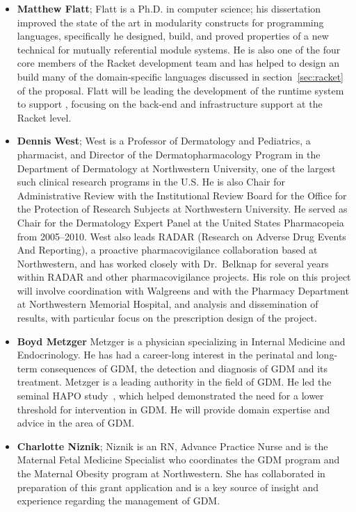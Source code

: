\begin{itemize}
\item\textbf{Matthew Flatt}; Flatt is a Ph.D. in computer science; his
  dissertation improved the state of the art in modularity constructs
  for programming languages, specifically he designed, build, and
  proved properties of a new technical for mutually referential
  module systems. He is also one of the four core members of the
  Racket development team and has helped to design an build many of
  the domain-specific languages discussed in section~\ref{sec:racket}
  of the proposal. Flatt will be leading the development of the
  runtime system to support \poppl{}, focusing on the back-end and
  infrastructure support at the Racket level.

\item\textbf{Dennis West}; West is a Professor of Dermatology and
  Pediatrics, a pharmacist, and Director of the Dermatopharmacology
  Program in the Department of Dermatology at Northwestern University,
  one of the largest such clinical research programs in the U.S. He is
  also Chair for Administrative Review with the Institutional Review
  Board for the Office for the Protection of Research Subjects at
  Northwestern University.  He served as Chair for the Dermatology
  Expert Panel at the United States Pharmacopeia from 2005--2010. West
  also leads RADAR (Research on Adverse Drug Events And Reporting), a
  proactive pharmacovigilance collaboration based at Northwestern, and
  has worked closely with Dr.\ Belknap for several years within RADAR
  and other pharmacovigilance projects. His role on this project will
  involve coordination with Walgreens and with the Pharmacy Department
  at Northwestern Memorial Hospital, and analysis and dissemination of
  results, with particular focus on the prescription design of the
  project.

\item\textbf{Boyd Metzger} Metzger is a physician specializing in
  Internal Medicine and Endocrinology. He has had a career-long
  interest in the perinatal and long-term consequences of GDM, the
  detection and diagnosis of GDM and its treatment. Metzger is a
  leading authority in the field of GDM. He led the seminal HAPO
  study~\citep{hapo}, which helped demonstrated the need for a lower
  threshold for intervention in GDM. He will provide domain expertise
  and advice in the area of GDM.

\item\textbf{Charlotte Niznik}; Niznik is an RN, Advance Practice
  Nurse and is the Maternal Fetal Medicine Specialist who coordinates
  the GDM program and the Maternal Obesity program at
  Northwestern. She has collaborated in preparation of this grant
  application and is a key source of insight and experience regarding
  the management of GDM.


\end{itemize}

